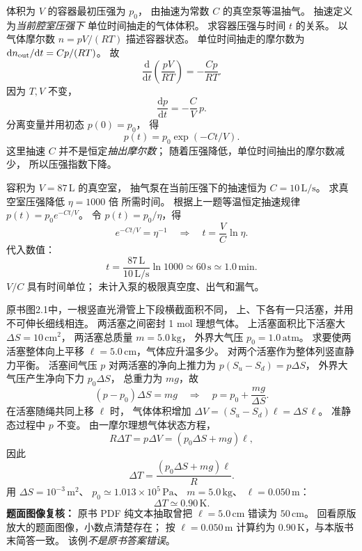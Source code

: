 体积为 $V$ 的容器最初压强为 $p_0$，
由抽速为常数 $C$ 的真空泵等温抽气。
抽速定义为\emph{当前腔室压强下}
单位时间抽走的气体体积。
求容器压强与时间 $t$ 的关系。
\exsolution
以气体摩尔数 $n=pV/(RT)$ 描述容器状态。
单位时间抽走的摩尔数为
$\mathrm d n_{\rm out}/\mathrm dt=Cp/(RT)$。
故
\[
\frac{\mathrm d}{\mathrm dt}\left(\frac{pV}{RT}\right)
=-\frac{Cp}{RT}.
\]
因为 $T,V$ 不变，
\[
\frac{\mathrm dp}{\mathrm dt}
=-\frac CV\,p.
\]
分离变量并用初态 $p(0)=p_0$，
得
\[
\boxed{p(t)=p_0\exp(-Ct/V)}.
\]
\excheck 这里抽速 $C$ 并不是恒定\emph{抽出摩尔数}；
随着压强降低，单位时间抽出的摩尔数减少，
所以压强指数下降。

容积为 $V=87\,\mathrm L$ 的真空室，
抽气泵在当前压强下的抽速恒为
$C=10\,\mathrm{L/s}$。
求真空室压强降低 $\eta=1000$ 倍
所需时间。
\exsolution
根据上一题等温恒定抽速规律
$p(t)=p_0e^{-Ct/V}$。
令 $p(t)=p_0/\eta$，得
\[
e^{-Ct/V}=\eta^{-1}
\quad\Longrightarrow\quad
\boxed{t=\frac VC\ln\eta}.
\]
代入数值：
\[
\boxed{t=\frac{87\,\mathrm L}{10\,\mathrm{L/s}}
\ln1000
\simeq60\,\mathrm s\simeq1.0\,\mathrm{min}}.
\]
\excheck $V/C$ 具有时间单位；
未计入泵的极限真空度、出气和漏气。

原书图2.1中，一根竖直光滑管上下段横截面积不同，
上、下各有一只活塞，并用不可伸长细线相连。
两活塞之间密封 1 mol 理想气体。
上活塞面积比下活塞大
$\Delta S=10\,\mathrm{cm^2}$，
两活塞总质量 $m=5.0\,\mathrm{kg}$，
外界大气压 $p_0=1.0\,\mathrm{atm}$。
求要使两活塞整体向上平移
$\ell=5.0\,\mathrm{cm}$，气体应升温多少。
\exsolution
对两个活塞作为整体列竖直静力平衡。
活塞间气压 $p$ 对两活塞的净向上推力为
$p(S_u-S_d)=p\Delta S$，
外界大气压产生净向下力 $p_0\Delta S$，
总重力为 $mg$，故
\[
(p-p_0)\Delta S=mg
\quad\Longrightarrow\quad
p=p_0+\frac{mg}{\Delta S}.
\]
在活塞随绳共同上移 $\ell$ 时，
气体体积增加
$\Delta V=(S_u-S_d)\ell=\Delta S\,\ell$。
准静态过程中 $p$ 不变。
由一摩尔理想气体状态方程，
\[
R\Delta T=p\Delta V
=(p_0\Delta S+mg)\ell,
\]
因此
\[
\boxed{\Delta T=\frac{(p_0\Delta S+mg)\ell}{R}}.
\]
用 $\Delta S=10^{-3}\,\mathrm{m^2}$、
$p_0\simeq1.013\times10^5\,\mathrm{Pa}$、
$m=5.0\,\mathrm{kg}$、
$\ell=0.050\,\mathrm m$：
\[
\boxed{\Delta T\simeq0.90\,\mathrm K}.
\]
\excheck \textbf{题面图像复核：}
原书 PDF 纯文本抽取曾把
$\ell=5.0\,\mathrm{cm}$ 错读为 $50\,\mathrm{cm}$。
回看原版放大的题面图像，小数点清楚存在；
按 $\ell=0.050\,\mathrm m$ 计算约为
$0.90\,\mathrm K$，与本版书末简答一致。
该例\emph{不是原书答案错误}。

